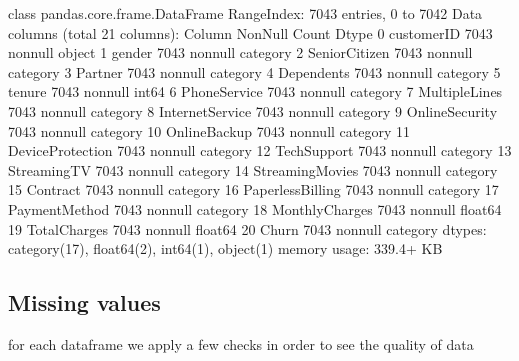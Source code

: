 \documentclass[letterpaper,10pt,english]{jupyterBook}
\begin{document}
\begin{sphinxVerbatim}[commandchars=\\\{\}]
\PYGZlt{}class \PYGZsq{}pandas.core.frame.DataFrame\PYGZsq{}\PYGZgt{}
RangeIndex: 7043 entries, 0 to 7042
Data columns (total 21 columns):
 \PYGZsh{}   Column            Non\PYGZhy{}Null Count  Dtype   
\PYGZhy{}\PYGZhy{}\PYGZhy{}  \PYGZhy{}\PYGZhy{}\PYGZhy{}\PYGZhy{}\PYGZhy{}\PYGZhy{}            \PYGZhy{}\PYGZhy{}\PYGZhy{}\PYGZhy{}\PYGZhy{}\PYGZhy{}\PYGZhy{}\PYGZhy{}\PYGZhy{}\PYGZhy{}\PYGZhy{}\PYGZhy{}\PYGZhy{}\PYGZhy{}  \PYGZhy{}\PYGZhy{}\PYGZhy{}\PYGZhy{}\PYGZhy{}   
 0   customerID        7043 non\PYGZhy{}null   object  
 1   gender            7043 non\PYGZhy{}null   category
 2   SeniorCitizen     7043 non\PYGZhy{}null   category
 3   Partner           7043 non\PYGZhy{}null   category
 4   Dependents        7043 non\PYGZhy{}null   category
 5   tenure            7043 non\PYGZhy{}null   int64   
 6   PhoneService      7043 non\PYGZhy{}null   category
 7   MultipleLines     7043 non\PYGZhy{}null   category
 8   InternetService   7043 non\PYGZhy{}null   category
 9   OnlineSecurity    7043 non\PYGZhy{}null   category
 10  OnlineBackup      7043 non\PYGZhy{}null   category
 11  DeviceProtection  7043 non\PYGZhy{}null   category
 12  TechSupport       7043 non\PYGZhy{}null   category
 13  StreamingTV       7043 non\PYGZhy{}null   category
 14  StreamingMovies   7043 non\PYGZhy{}null   category
 15  Contract          7043 non\PYGZhy{}null   category
 16  PaperlessBilling  7043 non\PYGZhy{}null   category
 17  PaymentMethod     7043 non\PYGZhy{}null   category
 18  MonthlyCharges    7043 non\PYGZhy{}null   float64 
 19  TotalCharges      7043 non\PYGZhy{}null   float64 
 20  Churn             7043 non\PYGZhy{}null   category
dtypes: category(17), float64(2), int64(1), object(1)
memory usage: 339.4+ KB
\end{sphinxVerbatim}


\subsection{Missing values}
\label{\detokenize{c7_case_studies/Churn:missing-values}}
\sphinxAtStartPar
for each dataframe we apply a few checks in order to see the quality of data

\begin{sphinxVerbatim}[commandchars=\\\{\}]
\PYG{p}{[}\PYG{p}{]}
\end{sphinxVerbatim}
\end{document}
